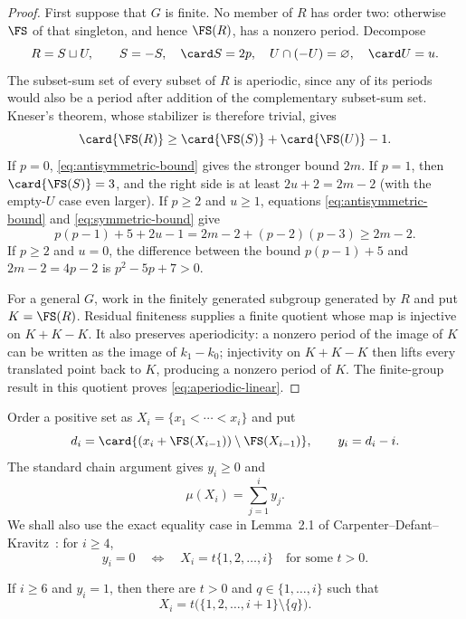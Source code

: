 \begin{proof}
First suppose that $G$ is finite.  No member of $R$ has order two: otherwise
$\FS$ of that singleton, and hence $\FS(R)$, has a nonzero period.  Decompose
\[
 R=S\sqcup U,\qquad S=-S,\quad \card S=2p,\quad
 U\cap(-U)=\varnothing,\quad \card U=u.
\]
The subset-sum set of every subset of $R$ is aperiodic, since any of its
periods would also be a period after addition of the complementary
subset-sum set.  Kneser's theorem, whose stabilizer is therefore trivial,
gives
\[
 \card{\FS(R)}\geq\card{\FS(S)}+\card{\FS(U)}-1.
\]
If $p=0$, \eqref{eq:antisymmetric-bound} gives the stronger bound $2m$.
If $p=1$, then $\card{\FS(S)}=3$, and the right side is at least
$2u+2=2m-2$ (with the empty-$U$ case even larger).  If $p\geq2$ and
$u\geq1$, equations \eqref{eq:antisymmetric-bound} and
\eqref{eq:symmetric-bound} give
\[
 p(p-1)+5+2u-1
 =2m-2+(p-2)(p-3)\geq2m-2.
\]
If $p\geq2$ and $u=0$, the difference between the bound
$p(p-1)+5$ and $2m-2=4p-2$ is $p^2-5p+7>0$.

For a general $G$, work in the finitely generated subgroup generated by
$R$ and put $K=\FS(R)$.  Residual finiteness supplies a finite quotient whose
map is injective on $K+K-K$.  It also preserves aperiodicity: a nonzero period
of the image of $K$ can be written as the image of $k_1-k_0$; injectivity on
$K+K-K$ then lifts every translated point back to $K$, producing a nonzero
period of $K$.  The finite-group result in this quotient proves
\eqref{eq:aperiodic-linear}.
\end{proof}

Order a positive set as $X_i=\{x_1<\cdots<x_i\}$ and put
\[
 d_i=\card{(x_i+\FS(X_{i-1}))\setminus\FS(X_{i-1})},
 \qquad y_i=d_i-i.
\]
The standard chain argument gives $y_i\geq0$ and
\begin{equation}
 \mu(X_i)=\sum_{j=1}^i y_j.
 \label{eq:increment-sum}
\end{equation}
We shall also use the exact equality case in Lemma~2.1 of
Carpenter--Defant--Kravitz~\cite{CDK2026}: for $i\geq4$,
\begin{equation}
 y_i=0\quad\Longleftrightarrow\quad
 X_i=t\{1,2,\ldots,i\}\quad\text{for some }t>0.
 \label{eq:zero-increment}
\end{equation}

\begin{lemma}\label{lem:unit-increment}
If $i\geq6$ and $y_i=1$, then there are $t>0$ and $q\in\{1,\ldots,i\}$
such that
\begin{equation}
 X_i=t\bigl(\{1,2,\ldots,i+1\}\setminus\{q\}\bigr).
 \label{eq:unit-increment}
\end{equation}
\end{lemma}

